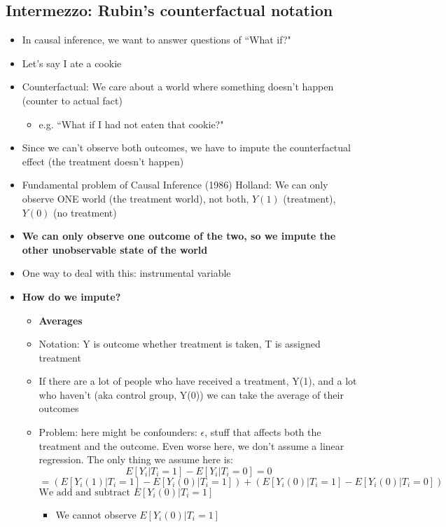 \documentclass[10pt, oneside]{article}
\begin{document}
\subsection{Intermezzo: Rubin's counterfactual notation}
\begin{itemize}
    \item In causal inference, we want to answer questions of ``What if?"
    \item Let's say I ate a cookie
    \item Counterfactual: We care about a world where something doesn't happen (counter to actual fact)
    \begin{itemize}
        \item e.g. ``What if I had not eaten that cookie?"
    \end{itemize}
    \item Since we can't observe both outcomes, we have to impute the counterfactual effect (the treatment doesn't happen)
    \item Fundamental problem of Causal Inference (1986) Holland: We can only observe ONE world (the treatment world), not both, $Y(1)$ (treatment), $Y(0)$ (no treatment)
    \item \textbf{We can only observe one outcome of the two, so we impute the other unobservable state of the world}
    \item One way to deal with this: instrumental variable
    \item \textbf{How do we impute?}
    \begin{itemize}
        \item \textbf{Averages}
        \item Notation: Y is outcome whether treatment is taken, T is assigned treatment
        \item If there are a lot of people who have received a treatment, Y(1), and a lot who haven't (aka control group, Y(0)) we can take the average of their outcomes
        \item Problem: here might be confounders: $\epsilon$, stuff that affects both the treatment and the outcome. Even worse here, we don't assume a linear regression. The only thing we assume here is: \[E[Y_i | T_i = 1] - E[Y_i | T_i = 0] = 0 \]
        \[= (E[Y_i (1) | T_i = 1] - E[Y_i (0) | T_i = 1]) + (E[Y_i (0) |T_i = 1] - E[Y_i(0) |T_i=0])\]
         $\text{We add and subtract $E[Y_i (0) | T_i = 1]$}$
        \begin{itemize}
            \item We cannot observe $E[Y_i (0) | T_i = 1]$

\end{itemize}
\end{itemize}
\end{itemize}
\end{document}
